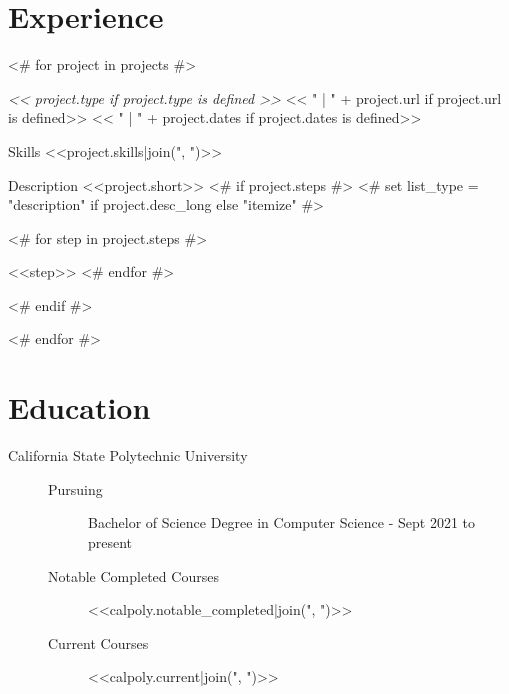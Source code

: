 \documentclass[a4paper,10pt]{extarticle}
\begin{document}
\section*{Experience}
\begin{description}
        <# for project in projects #>
    \item[<<project.name>>] \textit{<< project.type if project.type is defined >>} << " | " + project.url if project.url is defined>> << " | " + project.dates if project.dates is defined>>
        \begin{projects}
        \item [ Skills ] <<project.skills|join(", ")>>
        \item [ Description ] <<project.short>>
            <# if project.steps #>
            <# set list_type = "description" if project.desc_long else "itemize" #>
            \begin{<<list_type>>} %
                    <# for step in project.steps #>
                \item <<step>>
                    <# endfor #>
            \end{<<list_type>>}
            <# endif #>
        \end{projects}
        <# endfor #>
\end{description}

\section*{Education}
\begin{description}
    \item [ California State Polytechnic University ]\mbox{}
        \begin{description}
            \item [Pursuing] Bachelor of Science Degree in Computer Science - Sept 2021 to present
            \item [Notable Completed Courses] <<calpoly.notable_completed|join(", ")>>
            \item [Current Courses] <<calpoly.current|join(", ")>>
        \end{description}
\end{description}
\end{document}
